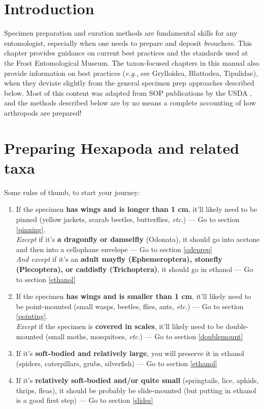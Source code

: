 \section*{Introduction}%
Specimen preparation and curation methods are fundamental skills for any entomologist, especially when one needs to prepare and deposit \textit b{vouchers}\citep{vouchersHuber,vouchers1}. This chapter provides guidance on current best practices and the standards used at the Frost Entomological Museum. The taxon-focused chapters in this manual also provide information on best practices (\textit{e.g.}, see Grylloidea, Blattodea, Tipulidae), when they deviate slightly from the general specimen prep approaches described below. Most of this content was adapted from SOP publications by the USDA \citep{USDAmanual,USDAmanual1986}, and the methods described below are by no means a complete accounting of how arthropods are prepared!

\section*{Preparing Hexapoda and related taxa}
Some rules of thumb, to start your journey: 
\begin{enumerate}
    \item If the specimen \textbf{has wings and is longer than 1 cm}, it'll likely need to be pinned (yellow jackets, scarab beetles, butterflies, \textit{etc}.) --- Go to section \ref{pinning}.\\
    \textit{Except} if it's \textbf{a dragonfly or damselfly} (Odonata), it should go into acetone and then into a cellophane envelope --- Go to section \ref{odeprep}\\
    \textit{And except} if it's an \textbf{adult mayfly (Ephemeroptera), stonefly (Plecoptera), or caddisfly (Trichoptera)}, it should go in ethanol --- Go to section \ref{ethanol}
    \item If the specimen \textbf{has wings and is smaller than 1 cm}, it'll likely need to be point-mounted (small wasps, beetles, flies, ants, \textit{etc}.) --- Go to section \ref{pointing}.\\
    \textit{Except} if the specimen is \textbf{covered in scales}, it'll likely need to be double-mounted (small moths, mosquitoes, \textit{etc}.) --- Go to section \ref{doublemount}
    \item If it's \textbf{soft-bodied and relatively large}, you will preserve it in ethanol (spiders, caterpillars, grubs, silverfish) --- Go to section \ref{ethanol}
    \item If it's \textbf{relatively soft-bodied and/or quite small} (springtails, lice, aphids, thrips, fleas), it should be probably be slide-mounted (but putting in ethanol is a good first step) --- Go to section \ref{slides}
\end{enumerate}

